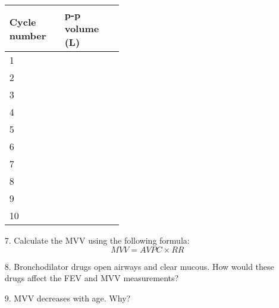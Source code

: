 \documentclass{article}
\begin{document}
\begin{itemize}
	\begin{table}[h]
	\centering
	\begin{tabular}[h!]{p{0.15\linewidth}|p{0.25\linewidth}}
	\toprule
	Cycle number & p-p volume (L)\\
	\midrule
	1 & \\\midrule
	2 & \\\midrule
	3 & \\\midrule
	4 & \\\midrule
	5 & \\\midrule
	6 & \\\midrule
	7 & \\\midrule
	8 & \\\midrule
	9 & \\\midrule
	10 & \\
	\bottomrule
	\end{tabular}
	\end{table}\vspace{3cm}

	
	\item[7.] Calculate the MVV using the following formula:\begin{equation}
		MVV = AVPC \times RR
	\end{equation}\vspace{2cm}
	
	\item[8.] Bronchodilator drugs open airways and clear mucous. How would these drugs affect the FEV and MVV measurements?\vspace{4cm}
	\item[9.] MVV decreases with age. Why?
\end{itemize}
\end{document}

